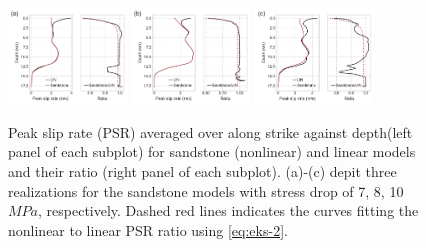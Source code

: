 \clearpage
\begin{figure}[!ht]
    \includegraphics[width=0.28\textwidth]{figures/figure_eks_2a.pdf}\label{fig:eks-2a} \hspace{0.02\textwidth}%
    \includegraphics[width=0.28\textwidth]{figures/figure_eks_2b.pdf}\label{fig:eks-2b} \hspace{0.02\textwidth}%
    \includegraphics[width=0.28\textwidth]{figures/figure_eks_2c.pdf}\label{fig:eks-2c} %
    \caption{Peak slip rate (PSR) averaged over along strike against depth(left panel of each subplot) for sandstone (nonlinear) and linear models and their ratio (right panel of each subplot). (a)-(c) depit three realizations for the sandstone models with stress drop of 7, 8, 10 $MPa$, respectively. Dashed red lines indicates the curves fitting the nonlinear to linear PSR ratio using \cref{eq:eks-2}.}
    \label{fig:eks-2}
\end{figure}
\clearpage


